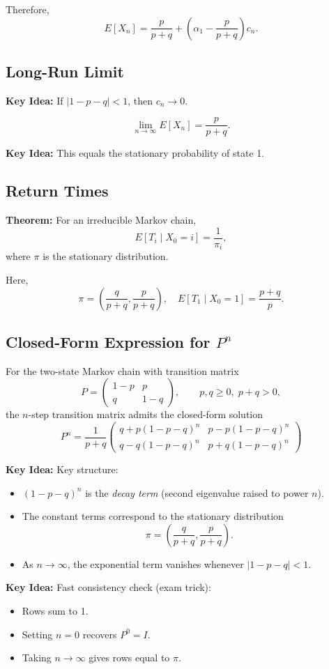 \documentclass[11pt]{article}
\newcommand{\thm}[1]{\textcolor{mygreen}{\textbf{Theorem:} #1}}
\newcommand{\idea}[1]{\textcolor{mygreen}{\textbf{Key Idea:} #1}}
\begin{document}
Therefore,
\[
E[X_n]
= \frac{p}{p+q} + \left(\alpha_1 - \frac{p}{p+q}\right)c_n.
\]

\subsection*{Long-Run Limit}
\idea{If $|1-p-q|<1$, then $c_n \to 0$.}

\[
\lim_{n\to\infty} E[X_n] = \frac{p}{p+q}.
\]

\idea{This equals the stationary probability of state 1.}

\subsection*{Return Times}
\thm{For an irreducible Markov chain,
\[
E[T_i \mid X_0=i] = \frac{1}{\pi_i},
\]
where $\pi$ is the stationary distribution.}

Here,
\[
\pi = \left(\frac{q}{p+q}, \frac{p}{p+q}\right),
\quad
E[T_1 \mid X_0=1] = \frac{p+q}{p}.
\]

\subsection*{Closed-Form Expression for \texorpdfstring{$P^n$}{Pn}}

For the two-state Markov chain with transition matrix
\[
P =
\begin{pmatrix}
1-p & p\\
q & 1-q
\end{pmatrix},
\qquad p,q \ge 0,\; p+q>0,
\]
the $n$-step transition matrix admits the closed-form solution
\[
\boxed{
P^n
=
\frac{1}{p+q}
\begin{pmatrix}
q + p(1-p-q)^n & p - p(1-p-q)^n\\[6pt]
q - q(1-p-q)^n & p + q(1-p-q)^n
\end{pmatrix}
}
\]

\idea{Key structure:}
\begin{itemize}[leftmargin=1.2em]
  \item $(1-p-q)^n$ is the \emph{decay term} (second eigenvalue raised to power $n$).
  \item The constant terms correspond to the stationary distribution
  \[
  \pi=\left(\frac{q}{p+q},\frac{p}{p+q}\right).
  \]
  \item As $n\to\infty$, the exponential term vanishes whenever $|1-p-q|<1$.
\end{itemize}

\idea{Fast consistency check (exam trick):}
\begin{itemize}[leftmargin=1.2em]
  \item Rows sum to 1.
  \item Setting $n=0$ recovers $P^0=I$.
  \item Taking $n\to\infty$ gives rows equal to $\pi$.
\end{itemize}
\end{document}
